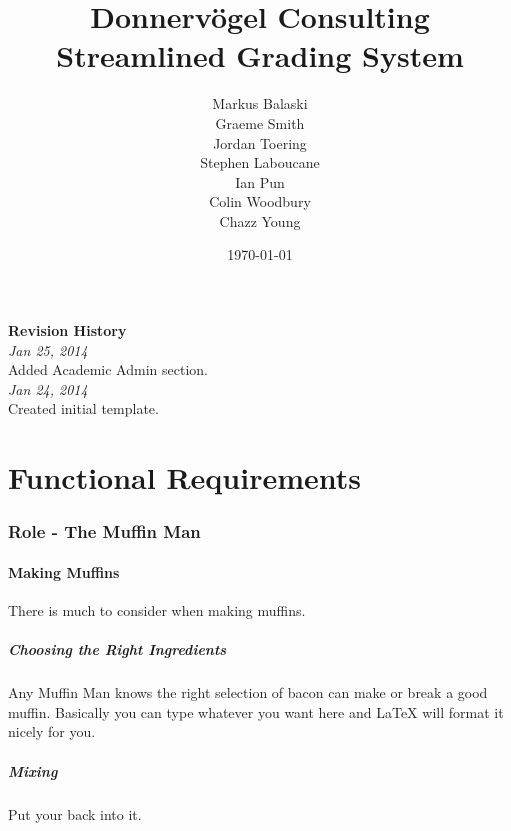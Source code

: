 \documentclass{article}
\begin{document}
\title{Donnervögel Consulting \\ Streamlined Grading System}
\author{Markus Balaski \\ Graeme Smith \\ Jordan Toering \\ Stephen Laboucane \\ Ian Pun \\ Colin Woodbury \\ Chazz Young}
\date{\today}
\maketitle
\clearpage

\textbf{Revision History}\\
\emph{Jan 25, 2014}\\
Added Academic Admin section.\\
\emph{Jan 24, 2014}\\
Created initial template.\\
\clearpage

\tableofcontents
\clearpage

\part{Functional Requirements}
\section{Role - The Muffin Man}
\subsection{Making Muffins}
There is much to consider when making muffins.
\subsubsection{Choosing the Right Ingredients}
Any Muffin Man knows the right selection of bacon can make or break a good
muffin. Basically you can type whatever you want here and LaTeX will format it
nicely for you.
\subsubsection{Mixing}
Put your back into it.
\end{document}
